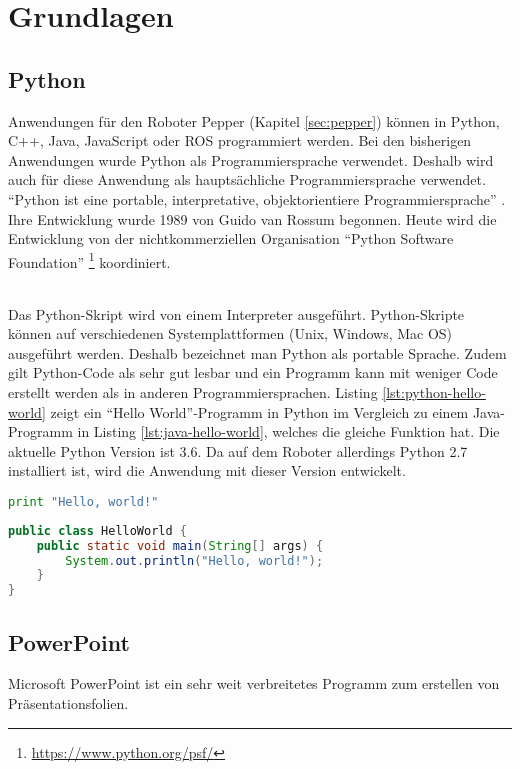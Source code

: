 \chapter{Grundlagen}\label{sec:grundlagen}
\section{Python}\label{sec:python}
Anwendungen für den Roboter Pepper (Kapitel \ref{sec:pepper}) können in Python,
C++, Java, JavaScript oder ROS programmiert werden. \cite{SoftBankIII2018} Bei
den bisherigen Anwendungen wurde Python als Programmiersprache verwendet.
Deshalb wird auch für diese Anwendung als
hauptsächliche Programmiersprache verwendet. "`Python ist eine portable,
interpretative, objektorientiere Programmiersprache"' \cite{Weigend2017}. Ihre
Entwicklung wurde 1989 von Guido van Rossum begonnen. Heute wird die Entwicklung
von der nichtkommerziellen Organisation "`Python Software Foundation"'
\footnote{\url{https://www.python.org/psf/}} koordiniert.

\subparagraph{}
Das Python-Skript wird von einem Interpreter ausgeführt. Python-Skripte können
auf verschiedenen Systemplattformen (Unix, Windows, Mac OS) ausgeführt werden.
Deshalb bezeichnet man Python als portable Sprache. Zudem gilt Python-Code als
sehr gut lesbar und ein Programm kann mit weniger Code erstellt
werden als in anderen Programmiersprachen. Listing \ref{lst:python-hello-world}
zeigt ein "`Hello World"'-Programm in Python im Vergleich zu einem Java-Programm
in Listing \ref{lst:java-hello-world}, welches die gleiche Funktion hat.
Die aktuelle Python Version ist 3.6.
Da auf dem Roboter allerdings Python 2.7 installiert ist, wird die Anwendung mit
dieser Version entwickelt. \cite{Weigend2017}

\begin{lstlisting}[float, language=Python, frame=single, framexleftmargin=15pt,
style=algoBericht, label={lst:python-hello-world}, captionpos=b, caption={Hello
World in Python}]
print "Hello, world!"
\end{lstlisting}

\begin{lstlisting}[float, language=Java, frame=single, framexleftmargin=15pt,
style=algoBericht, label={lst:java-hello-world}, captionpos=b, caption={Hello
World in Java}]
public class HelloWorld { 
	public static void main(String[] args) {
		System.out.println("Hello, world!"); 
	}
}
\end{lstlisting}

\section{PowerPoint}\label{sec:powerpoint}
Microsoft PowerPoint ist ein sehr weit verbreitetes Programm zum erstellen von
Präsentationsfolien.

